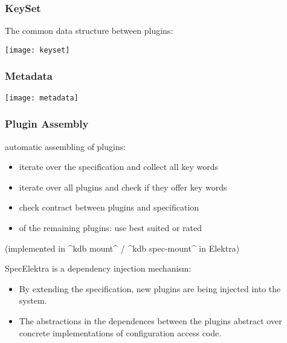 \begin{frame}
	\frametitle{KeySet}

	The common data structure between plugins:
	\vspace{1cm}

	\texttt{[image: keyset]}
\end{frame}

\begin{frame}
	\frametitle{Metadata}

	\texttt{[image: metadata]}
\end{frame}

\begin{frame}[fragile]
	\frametitle{Plugin Assembly}

	automatic assembling of plugins:

	\begin{itemize}[<+->]
	\item iterate over the specification and collect all key words
	\item iterate over all plugins and check if they offer key words
	\item check contract between plugins and specification
	\item of the remaining plugins: use best suited or rated
	\end{itemize}

	\vspace{1cm}

	\pause[\thebeamerpauses]

	(implemented in ^kdb mount^ / ^kdb spec-mount^ in Elektra)
\end{frame}

\begin{frame}
	SpecElektra is a dependency injection mechanism:

	\begin{itemize}[<+->]
	\item By extending the specification, new plugins are being injected into the system.
	\item The  abstractions in the dependences between the plugins abstract over concrete implementations of configuration access code.
	\end{itemize}
\end{frame}

